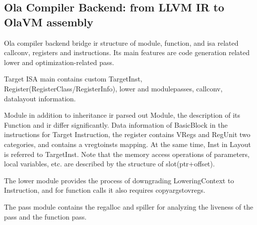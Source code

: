 \subsection{Ola Compiler Backend: from LLVM IR to OlaVM assembly}

Ola compiler backend bridge ir structure of module, function, and isa related callconv, registers and instructions.
Its main features are code generation related lower and optimization-related pass.

Target ISA main contains custom TargetInst, Register(RegisterClass/RegisterInfo), lower and modulepasses, callconv, datalayout information.

Module in addition to inheritance ir parsed out Module, the description of its Function and ir differ significantly.
Data information of BasicBlock in the instructions for Target Instruction, the register contains VRegs and RegUnit two categories, and contains a vregtoinsts mapping.
At the same time, Inst in Layout is referred to TargetInst. Note that the memory access operations of parameters, local variables, etc. are described by the structure of slot(ptr+offset).

The lower module provides the process of downgrading LoweringContext to Instruction, and for function calls it also requires copyargstovregs.

The pass module contains the regalloc and spiller for analyzing the liveness of the pass and the function pass.











